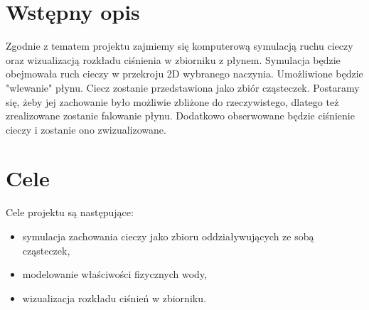 \documentclass[a4paper]{article}
\begin{document}

\section{Wstępny opis}
Zgodnie z tematem projektu zajmiemy się komputerową symulacją ruchu cieczy oraz wizualizacją rozkładu ciśnienia w zbiorniku z płynem.
Symulacja będzie obejmowała ruch cieczy w przekroju 2D wybranego naczynia.  Umożliwione będzie "wlewanie" płynu. Ciecz zostanie przedstawiona jako zbiór cząsteczek. Postaramy się, żeby jej zachowanie było możliwie zbliżone do rzeczywistego, dlatego też zrealizowane zostanie falowanie płynu.
Dodatkowo obserwowane będzie ciśnienie cieczy i zostanie ono zwizualizowane. 

\section{Cele}
Cele projektu są następujące:
\begin{itemize}
  \item symulacja zachowania cieczy jako zbioru oddziaływujących ze sobą cząsteczek,
  \item modelowanie właściwości fizycznych wody,
  \item wizualizacja rozkładu ciśnień w zbiorniku.
\end{itemize}
\end{document}
